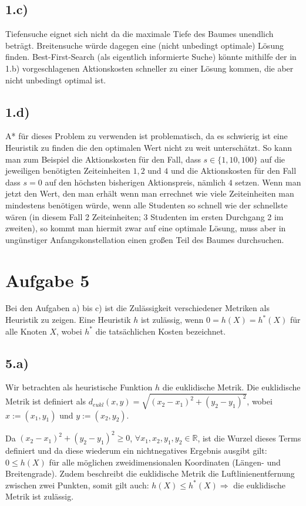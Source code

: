 \documentclass[a4paper]{article}
\newcommand{\IR}{\mathbb{R}}
\begin{document}
\subsection*{1.c)}
Tiefensuche eignet sich nicht da die maximale Tiefe des Baumes unendlich beträgt. Breitensuche würde dagegen eine (nicht unbedingt optimale) Lösung finden. Best-First-Search (als eigentlich informierte Suche) könnte mithilfe der in 1.b) vorgeschlagenen Aktionskosten schneller zu einer Lösung kommen, die aber nicht unbedingt optimal ist.

\subsection*{1.d)}
A* für dieses Problem zu verwenden ist problematisch, da es schwierig ist eine Heuristik zu finden die den optimalen Wert nicht zu weit unterschätzt. So kann man zum Beispiel die Aktionskosten für den Fall, dass $s \in \{1,10,100\}$ auf die jeweiligen benötigten Zeiteinheiten $1, 2$ und $4$ und die Aktionskosten für den Fall dass $s=0$ auf den höchsten bisherigen Aktionspreis, nämlich $4$ setzen. Wenn man jetzt den Wert, den man erhält wenn man errechnet wie viele Zeiteinheiten man mindestens benötigen würde, wenn alle Studenten so schnell wie der schnellste wären (in diesem Fall 2 Zeiteinheiten; 3 Studenten im ersten Durchgang 2 im zweiten), so kommt man hiermit zwar auf eine optimale Lösung, muss aber in ungünstiger Anfangskonstellation einen großen Teil des Baumes durchsuchen.

\section*{Aufgabe 5}
Bei den Aufgaben a) bis c) ist die Zul\"assigkeit verschiedener Metriken als Heuristik zu zeigen. Eine Heuristik $h$ ist zul\"assig, wenn $0 = h(X) = h^\ast(X)$ f\"ur alle Knoten $X$, wobei $h^\ast$ die tats\"achlichen Kosten bezeichnet.

\subsection*{5.a)}
Wir betrachten als heuristische Funktion $h$ die euklidische Metrik. Die euklidische Metrik ist definiert als $d_{eukl}(x,y) = \sqrt{(x_2-x_1)^2+(y_2-y_1)^2} $, wobei $x:=(x_1,y_1)$ und $y:=(x_2,y_2)$. 

Da $(x_2-x_1)^2+(y_2-y_1)^2\geq0$, $\forall x_1,x_2,y_1,y_2 \in \IR$, ist die Wurzel dieses Terms definiert und da diese wiederum ein nichtnegatives Ergebnis ausgibt gilt: $0 \leq h(X)$ f\"ur alle m\"oglichen zweidimensionalen Koordinaten (L\"angen- und Breitengrade). Zudem beschreibt die euklidische Metrik die Luftlinienentfernung zwischen zwei Punkten, somit gilt auch: $h(X) \leq h^\ast(X) \Rightarrow$ die euklidische Metrik ist zul\"assig.
\end{document}
